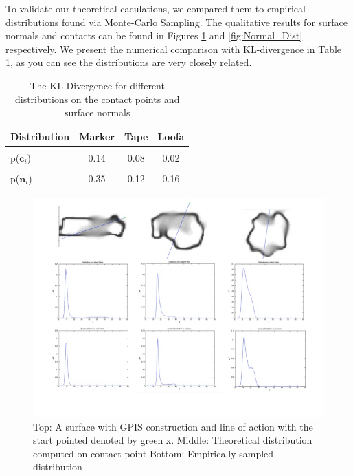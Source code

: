 \documentclass[letterpaper, 10 pt, conference]{ieeeconf}  %
\begin{document}
To validate our theoretical caculations, we compared them to empirical distributions found via Monte-Carlo Sampling. The qualitative results for surface normals and contacts can be found in Figures \ref{fig:Contact_Dist} and \ref{fig:Normal_Dist} respectively. We present the numerical comparison with KL-divergence in Table 1, as you can see the distributions are very closely related. 

\begin{table}[h]
        \begin{tabular}{ l | c c c}
         Distribution & \bf Marker & \bf Tape & \bf Loofa \\ 
        \hline \\
         p($\textbf{c}_i$) & 0.14 & 0.08 & 0.02 \\
        \hline \\
        p($\textbf{n}_i$)& 0.35 & 0.12 & 0.16 \\
        \hline 
        \end{tabular}
        \caption{The KL-Divergence for different distributions on the contact points and surface normals}
		
        \vspace*{-10pt}
\end{table}


\begin{figure}[h]
\centering
\includegraphics[scale = 0.3]{figures/Slide07.jpg}
\caption{Top: A surface with GPIS construction and line of action with the start pointed denoted by green x.
Middle: Theoretical distribution computed on contact point
Bottom: Empirically sampled distribution}
\vspace*{-10pt}
\label{fig:Contact_Dist}
\end{figure}
\end{document}
